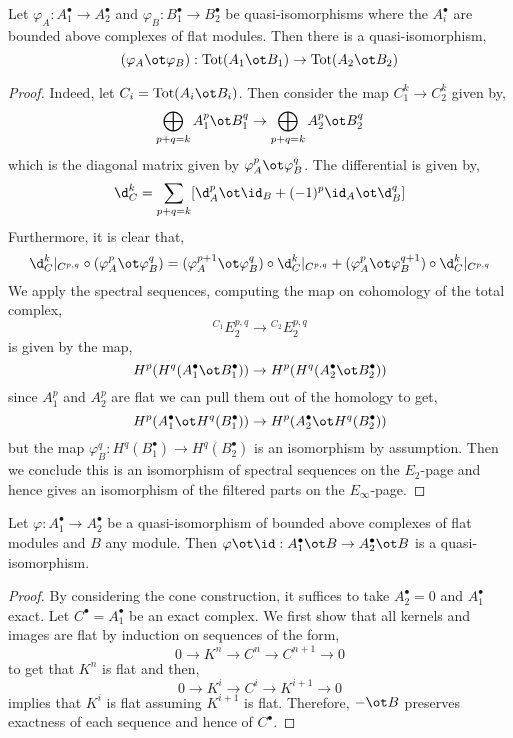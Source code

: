 \documentclass[12pt]{article}
\begin{document}
\begin{prop}
Let $\varphi_A : A^\bullet_1 \to A^\bullet_2$ and $\varphi_B : B_1^\bullet \to B_2^\bullet$ be quasi-isomorphisms where the $A_i^\bullet$ are bounded above complexes of flat modules. Then there is a quasi-isomorphism,
\[ (\varphi_A \ot \varphi_B) : \Tot(A_1 \ot B_1) \to \Tot(A_2 \ot B_2) \]
\end{prop}

\begin{proof}
Indeed, let $C_i = \Tot(A_i \ot B_i)$. Then consider the map $C_1^k \to C_2^k$ given by,
\[ \bigoplus_{p + q = k} A^p_1 \ot B^q_1 \to \bigoplus_{p + q = k} A^p_2 \ot B^q_2 \]
which is the diagonal matrix given by $\varphi_A^p \ot \varphi_B^q$. The differential is given by,
\[ \d^k_C = \sum_{p + q = k} [\d^p_A \ot \id_B + (-1)^p \id_A \ot \d^q_B] \]
Furthermore, it is clear that,
\[ \d_C^k|_{C^{p,q}} \circ (\varphi_A^p \ot \varphi_B^q) = (\varphi_A^{p+1} \ot \varphi_B^q) \circ \d_C^k|_{C^{p,q}} + (\varphi_A^{p} \ot \varphi_B^{q+1}) \circ \d_C^k|_{C^{p,q}} \]
We apply the spectral sequences, computing the map on cohomology of the total complex,
\[ {}^{C_1} E^{p,q}_2 \to {}^{C_2} E^{p,q}_2 \]
is given by the map,
\[ H^p(H^q(A_1^\bullet \ot B_1^\bullet)) \to H^p(H^q(A_2^\bullet \ot B_2^\bullet)) \]
since $A_1^p$ and $A_2^p$ are flat we can pull them out of the homology to get,
\[ H^p(A_1^\bullet \ot H^q(B_1^\bullet)) \to H^p(A_2^\bullet \ot H^q(B_2^\bullet)) \]
but the map $\varphi_B^q : H^q(B_1^\bullet) \to H^q(B_2^\bullet)$ is an isomorphism by assumption. Then we conclude this is an isomorphism of spectral sequences on the $E_2$-page and hence gives an isomorphism of the filtered parts on the $E_{\infty}$-page.
\end{proof}

\begin{lemma}
Let $\varphi : A_1^\bullet \to A_2^\bullet$ be a quasi-isomorphism of bounded above complexes of flat modules and $B$ any module. Then $\varphi \ot \id : A_1^\bullet \ot B \to A_2^\bullet \ot B$ is a quasi-isomorphism.
\end{lemma}

\begin{proof}
By considering the cone construction, it suffices to take $A_2^\bullet = 0$ and $A_1^\bullet$ exact. Let $C^\bullet = A_1^\bullet$ be an exact complex. We first show that all kernels and images are flat by induction on sequences of the form,
\[ 0 \to K^n \to C^n \to C^{n+1} \to 0 \]
to get that $K^n$ is flat and then,
\[ 0 \to K^i \to C^i \to K^{i+1} \to 0 \]
implies that $K^i$ is flat assuming $K^{i+1}$ is flat. Therefore, $-\ot B$ preserves exactness of each sequence and hence of $C^\bullet$.
\end{proof}
\end{document}
